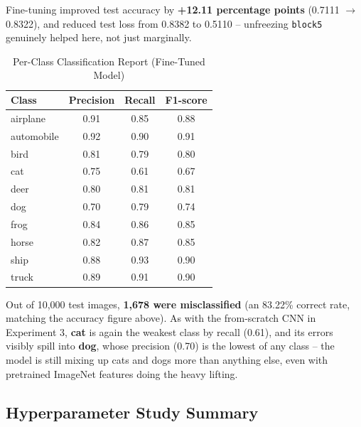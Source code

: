 \documentclass[11pt]{article}
\begin{document}
Fine-tuning improved test accuracy by \textbf{+12.11 percentage points} (0.7111 $\rightarrow$ 0.8322), and reduced test loss from 0.8382 to 0.5110 -- unfreezing \texttt{block5} genuinely helped here, not just marginally.

\begin{table}[H]
\centering
\caption{Per-Class Classification Report (Fine-Tuned Model)}
\begin{tabular}{lccc}
\toprule
Class & Precision & Recall & F1-score \\
\midrule
airplane   & 0.91 & 0.85 & 0.88 \\
automobile & 0.92 & 0.90 & 0.91 \\
bird       & 0.81 & 0.79 & 0.80 \\
cat        & 0.75 & 0.61 & 0.67 \\
deer       & 0.80 & 0.81 & 0.81 \\
dog        & 0.70 & 0.79 & 0.74 \\
frog       & 0.84 & 0.86 & 0.85 \\
horse      & 0.82 & 0.87 & 0.85 \\
ship       & 0.88 & 0.93 & 0.90 \\
truck      & 0.89 & 0.91 & 0.90 \\
\bottomrule
\end{tabular}
\end{table}

Out of 10,000 test images, \textbf{1,678 were misclassified} (an 83.22\% correct rate, matching the accuracy figure above). As with the from-scratch CNN in Experiment 3, \textbf{cat} is again the weakest class by recall (0.61), and its errors visibly spill into \textbf{dog}, whose precision (0.70) is the lowest of any class -- the model is still mixing up cats and dogs more than anything else, even with pretrained ImageNet features doing the heavy lifting.

\subsection*{Hyperparameter Study Summary}
\end{document}
